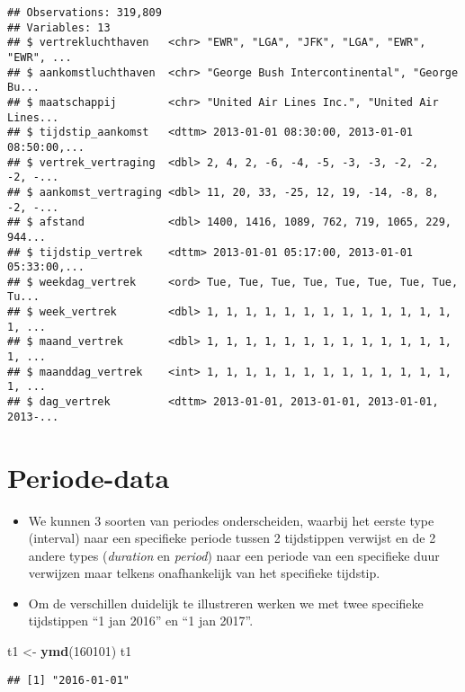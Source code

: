 \documentclass[]{memoir}
\newenvironment{Shaded}{\begin{snugshade}}{\end{snugshade}}
\newcommand{\DecValTok}[1]{\textcolor[rgb]{0.00,0.00,0.81}{#1}}
\newcommand{\KeywordTok}[1]{\textcolor[rgb]{0.13,0.29,0.53}{\textbf{#1}}}
\newcommand{\NormalTok}[1]{#1}
\newcommand{\StringTok}[1]{\textcolor[rgb]{0.31,0.60,0.02}{#1}}
\providecommand{\tightlist}{%
  \setlength{\itemsep}{0pt}\setlength{\parskip}{0pt}}
\begin{document}
\begin{verbatim}
## Observations: 319,809
## Variables: 13
## $ vertrekluchthaven   <chr> "EWR", "LGA", "JFK", "LGA", "EWR", "EWR", ...
## $ aankomstluchthaven  <chr> "George Bush Intercontinental", "George Bu...
## $ maatschappij        <chr> "United Air Lines Inc.", "United Air Lines...
## $ tijdstip_aankomst   <dttm> 2013-01-01 08:30:00, 2013-01-01 08:50:00,...
## $ vertrek_vertraging  <dbl> 2, 4, 2, -6, -4, -5, -3, -3, -2, -2, -2, -...
## $ aankomst_vertraging <dbl> 11, 20, 33, -25, 12, 19, -14, -8, 8, -2, -...
## $ afstand             <dbl> 1400, 1416, 1089, 762, 719, 1065, 229, 944...
## $ tijdstip_vertrek    <dttm> 2013-01-01 05:17:00, 2013-01-01 05:33:00,...
## $ weekdag_vertrek     <ord> Tue, Tue, Tue, Tue, Tue, Tue, Tue, Tue, Tu...
## $ week_vertrek        <dbl> 1, 1, 1, 1, 1, 1, 1, 1, 1, 1, 1, 1, 1, 1, ...
## $ maand_vertrek       <dbl> 1, 1, 1, 1, 1, 1, 1, 1, 1, 1, 1, 1, 1, 1, ...
## $ maanddag_vertrek    <int> 1, 1, 1, 1, 1, 1, 1, 1, 1, 1, 1, 1, 1, 1, ...
## $ dag_vertrek         <dttm> 2013-01-01, 2013-01-01, 2013-01-01, 2013-...
\end{verbatim}

\hypertarget{periode-data}{%
\section{Periode-data}\label{periode-data}}

\begin{itemize}
\tightlist
\item
  We kunnen 3 soorten van periodes onderscheiden, waarbij het eerste type (interval) naar een specifieke periode tussen 2 tijdstippen verwijst en de 2 andere types (\emph{duration} en \emph{period}) naar een periode van een specifieke duur verwijzen maar telkens onafhankelijk van het specifieke tijdstip.
\item
  Om de verschillen duidelijk te illustreren werken we met twee specifieke tijdstippen ``1 jan 2016'' en ``1 jan 2017''.
\end{itemize}

\begin{Shaded}
\begin{Highlighting}[]
\NormalTok{t1 <-}\StringTok{ }\KeywordTok{ymd}\NormalTok{(}\DecValTok{160101}\NormalTok{)}
\NormalTok{t1}
\end{Highlighting}
\end{Shaded}

\begin{verbatim}
## [1] "2016-01-01"
\end{verbatim}
\end{document}
